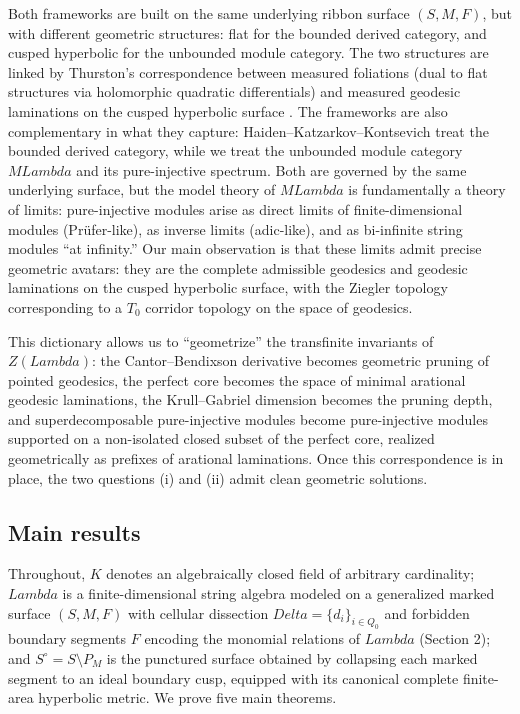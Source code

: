 \documentclass[11pt,a4paper,reqno]{amsart}
\def\mathcal#1{#1}%
\def\mathbb#1{#1}%
\def\operatorname#1{#1}%
\def\K{K}%
\def\forb{F}%
\def\Zg{Z}%
\def\Mod{M}%
\def\Delta{Delta}%
\def\Lambda{Lambda}%
\def\emph#1{#1}%
\theoremstyle{definition}
\theoremstyle{remark}
\newcommand{\K}{\mathbb{K}}
\newcommand{\Mod}[1]{\operatorname{Mod}(#1)}
\newcommand{\Zg}{\operatorname{Zg}}
\newcommand{\forb}{\mathfrak{F}}
\begin{document}
Both frameworks are built on the same underlying ribbon surface $(\mathcal{S}, \mathcal{M}, \forb)$, but with different geometric structures: flat for the bounded derived category, and cusped hyperbolic for the unbounded module category. The two structures are linked by Thurston's correspondence between measured foliations (dual to flat structures via holomorphic quadratic differentials) and measured geodesic laminations on the cusped hyperbolic surface \cite{Thurston1988}. The frameworks are also complementary in what they capture: Haiden--Katzarkov--Kontsevich treat the \emph{bounded derived} category, while we treat the \emph{unbounded} module category $\Mod{\Lambda}$ and its pure-injective spectrum. Both are governed by the same underlying surface, but the model theory of $\Mod{\Lambda}$ is fundamentally a theory of \emph{limits}: pure-injective modules arise as direct limits of finite-dimensional modules (Pr\"ufer-like), as inverse limits (adic-like), and as bi-infinite string modules ``at infinity.'' Our main observation is that these limits admit precise geometric avatars: they are the complete admissible geodesics and geodesic laminations on the cusped hyperbolic surface, with the Ziegler topology corresponding to a $T_0$ corridor topology on the space of geodesics.

This dictionary allows us to ``geometrize'' the transfinite invariants of $\Zg(\Lambda)$: the Cantor--Bendixson derivative becomes \emph{geometric pruning} of pointed geodesics, the perfect core becomes the space of \emph{minimal arational geodesic laminations}, the Krull--Gabriel dimension becomes the \emph{pruning depth}, and superdecomposable pure-injective modules become pure-injective modules supported on a non-isolated closed subset of the perfect core, realized geometrically as prefixes of arational laminations. Once this correspondence is in place, the two questions (i) and (ii) admit clean geometric solutions.

\subsection{Main results}
\label{subsec:main_results}

Throughout, $\K$ denotes an algebraically closed field of \emph{arbitrary cardinality}; $\Lambda$ is a finite-dimensional string algebra modeled on a generalized marked surface $(\mathcal{S}, \mathcal{M}, \forb)$ with cellular dissection $\Delta = \{d_i\}_{i \in Q_0}$ and forbidden boundary segments $\forb$ encoding the monomial relations of $\Lambda$ (Section 2); and $\mathcal{S}^\circ = \mathcal{S} \setminus \mathcal{P}_{\mathcal{M}}$ is the punctured surface obtained by collapsing each marked segment to an ideal boundary cusp, equipped with its canonical complete finite-area hyperbolic metric. We prove five main theorems.
\end{document}
